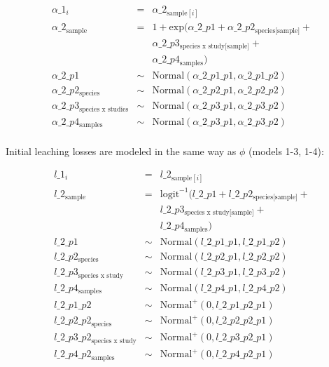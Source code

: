 \documentclass[
  12pt,
]{article}
\begin{document}
\begin{equation}
\begin{aligned}
\alpha\_1_i & = & \alpha\_2_{\text{sample}[i]}\\
\alpha\_2_{\text{sample}} & = & 1 + \text{exp}(\alpha\_2\_p1 + \alpha\_2\_p2_{\text{species[sample]}} + \\
                         && \alpha\_2\_p3_{\text{species x study[sample]}} + \\
                         && \alpha\_2\_p4_{\text{samples}})\\
\alpha\_2\_p1 & \sim & \text{Normal}(\alpha\_2\_p1\_p1, \alpha\_2\_p1\_p2)\\
\alpha\_2\_p2_{\text{species}} & \sim & \text{Normal}(\alpha\_2\_p2\_p1, \alpha\_2\_p2\_p2)\\
\alpha\_2\_p3_{\text{species x studies}} & \sim & \text{Normal}(\alpha\_2\_p3\_p1, \alpha\_2\_p3\_p2)\\
\alpha\_2\_p4_{\text{samples}} & \sim & \text{Normal}(\alpha\_2\_p3\_p1, \alpha\_2\_p3\_p2)\\
\label{eq:sup-model-6}
\end{aligned}
\end{equation}

Initial leaching losses are modeled in the same way as \(\phi\) (models 1-3, 1-4):

\begin{equation}
\begin{aligned}
l\_1_i & = & l\_2_{\text{sample}[i]}\\
l\_2_{\text{sample}} & = & \text{logit}^{-1}(l\_2\_p1 + l\_2\_p2_{\text{species[sample]}} + \\
                        && l\_2\_p3_{\text{species x study[sample]}} + \\                              && l\_2\_p4_{\text{samples}})\\
l\_2\_p1 & \sim & \text{Normal}(l\_2\_p1\_p1, l\_2\_p1\_p2)\\
l\_2\_p2_{\text{species}} & \sim & \text{Normal}(l\_2\_p2\_p1, l\_2\_p2\_p2)\\
l\_2\_p3_{\text{species x study}} & \sim & \text{Normal}(l\_2\_p3\_p1, l\_2\_p3\_p2)\\
l\_2\_p4_{\text{samples}} & \sim & \text{Normal}(l\_2\_p4\_p1, l\_2\_p4\_p2)\\
l\_2\_p1\_p2 & \sim & \text{Normal}^+(0, l\_2\_p1\_p2\_p1)\\
l\_2\_p2\_p2_{\text{species}} & \sim & \text{Normal}^+(0, l\_2\_p2\_p2\_p1)\\
l\_2\_p3\_p2_{\text{species x study}} & \sim & \text{Normal}^+(0, l\_2\_p3\_p2\_p1)\\
l\_2\_p4\_p2_{\text{samples}} & \sim & \text{Normal}^+(0, l\_2\_p4\_p2\_p1)\\
\label{eq:sup-model-7}
\end{aligned}
\end{equation}
\end{document}
